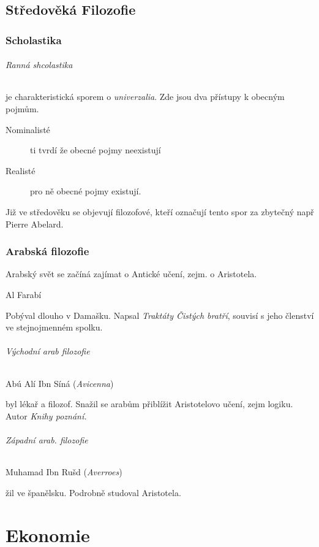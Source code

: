 \documentclass[10pt,a4paper,
twoside,%
]{report}
\begin{document}
\chapter{Středověká Filozofie}

\section{Scholastika}
\paragraph{Ranná shcolastika} je charakteristická sporem o \emph{univerzalia}. Zde jsou dva přístupy k obecným pojmům. 

\begin{description}
  \item[Nominalisté] ti tvrdí že obecné pojmy neexistují 
  \item[Realisté] pro ně obecné pojmy existují. 
\end{description}

Již ve středověku se objevují filozofové, kteří označují tento spor za zbytečný např \textsf{Pierre Abelard.}

\section{Arabská filozofie}

Arabský svět se začíná zajímat o Antické učení, zejm. o Aristotela. 

\subparagraph{Al Farabí} Pobýval dlouho v Damašku. Napsal \emph{Traktáty Čistých bratří}, souvisí s jeho členství ve stejnojmenném spolku. 

\paragraph{Východní arab filozofie }

\subparagraph{Abú Alí Ibn Síná (\emph{Avicenna})} byl lékař a filozof. Snažil se arabům přiblížit Aristotelovo učení, zejm logiku. Autor \emph{Knihy poznání.}

\paragraph{Západní arab. filozofie}

\subparagraph{Muhamad Ibn Rušd (\emph{Averroes})} žil ve španělsku. Podrobně studoval Aristotela.

\part{Ekonomie}
\end{document}
